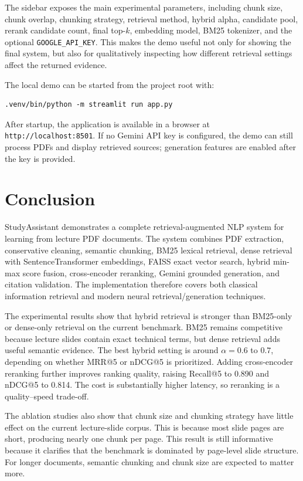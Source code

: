 \documentclass[11pt,a4paper]{article}
\begin{document}
The sidebar exposes the main experimental parameters, including chunk size,
chunk overlap, chunking strategy, retrieval method, hybrid alpha, candidate
pool, rerank candidate count, final top-$k$, embedding model, BM25 tokenizer, and
the optional \texttt{GOOGLE\_API\_KEY}. This makes the demo useful not only for
showing the final system, but also for qualitatively inspecting how different
retrieval settings affect the returned evidence.

The local demo can be started from the project root with:

\begin{lstlisting}
.venv/bin/python -m streamlit run app.py
\end{lstlisting}

After startup, the application is available in a browser at
\texttt{http://localhost:8501}. If no Gemini API key is configured, the demo can
still process PDFs and display retrieved sources; generation features are
enabled after the key is provided.

\section{Conclusion}

StudyAssistant demonstrates a complete retrieval-augmented NLP system for
learning from lecture PDF documents. The system combines PDF extraction,
conservative cleaning, semantic chunking, BM25 lexical retrieval, dense
retrieval with SentenceTransformer embeddings, FAISS exact vector search,
hybrid min-max score fusion, cross-encoder reranking, Gemini grounded
generation, and citation validation. The implementation therefore covers both
classical information retrieval and modern neural retrieval/generation
techniques.

The experimental results show that hybrid retrieval is stronger than BM25-only
or dense-only retrieval on the current benchmark. BM25 remains competitive
because lecture slides contain exact technical terms, but dense retrieval adds
useful semantic evidence. The best hybrid setting is around $\alpha=0.6$ to
$0.7$, depending on whether MRR@5 or nDCG@5 is prioritized. Adding cross-encoder
reranking further improves ranking quality, raising Recall@5 to 0.890 and
nDCG@5 to 0.814. The cost is substantially higher latency, so reranking is a
quality--speed trade-off.

The ablation studies also show that chunk size and chunking strategy have
little effect on the current lecture-slide corpus. This is because most slide
pages are short, producing nearly one chunk per page. This result is still
informative because it clarifies that the benchmark is dominated by page-level
slide structure. For longer documents, semantic chunking and chunk size are
expected to matter more.
\end{document}
